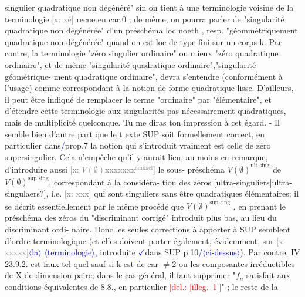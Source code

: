 \documentclass[11pt]{article}
\newcommand{\scanpage}[1]{\par\bigskip\noindent{\small\sffamily[scan #1]}\par}
\newcommand{\mspage}[1]{{\small\sffamily[p.\,#1]}}
\newcommand{\hand}[1]{\textcolor{blue}{#1}}
\newcommand{\inserted}[2][]{\textcolor{blue}{$\langle$#2$\rangle$}}
\newcommand{\deleted}[1]{\textcolor{red}{[\textsf{del.:} #1]}}
\newcommand{\xout}[1]{\textcolor{gray}{[\textsf{x:} #1]}}
\newcommand{\uline}[1]{\underline{#1}}
\newcommand{\unsure}[1]{[#1?]}
\newcommand{\illegible}[1]{[\textsf{illeg.\ #1}]}
\begin{document}
singulier quadratique  non dégénéré" sin on tient à une terminologie
voisine de la terminologie \xout{xé} recue en car.0 ; de même, on pourra
parler de "singularité quadratique non dégénérée" d'un préschéma loc
noeth , resp. "géommétriquement  quadratique non dégénérée" quand on est
loc de type fini sur un corps k.  Par contre, la terminologie
"zéro singulier ordinaire" ou mieux "zéro quadratique ordinaire",
et de même "singularité quadratique ordinaire","singularité géométrique-%
ment quadratique ordinaire",  devra s'entendre (conformément à l'usage)
comme correspondant à la notion de forme quadratique lisse. D'ailleurs,
il peut être indiqué de remplacer le terme "ordinaire" par "élémentaire",
et d'étendre cette terminologie aux singularités pas nécessairement
quadratiques, mais de multiplicité quelconque. Tu me diras ton impression
à cet égard.   -    Il semble bien d'autre part que le t exte SUP soit
formellement correct, en particulier dans\hand{/}prop.7  la notion qui s'introduit
vraiment est celle de zéro supersingulier.  Cela n'empêche qu'il y aurait
lieu, au moins en remarque, d'introduire aussi \xout{$V(\emptyset)$xxxxxxx$^{\text{sinxxél}}$} le sous-%
préschéma  $V(\emptyset)^{\text{ult sing}}$  de $V(\emptyset)^{\text{sup sing}}$, correspondant à la considéra-%
tion des zéros \unsure{ultra-singuliers|ultra-singulaers}, i.e. \xout{xxx} qui sont singuliers sans être
quadratiques élémentaires; il se décrit essentiellement par le même
procédé que $V(\emptyset)^{\text{sup sing}}$  , en prenant le préschéma des zéros du
"discriminant corrigé"  introduit plus bas, au lieu du discriminant ordi-%
naire.  Donc les seules corrections à apporter à SUP semblent d'ordre
terminologique (et elles doivent porter également, évidemment, sur \xout{xxxxx}\inserted[typed]{la}
\inserted[typed]{terminologie}\hand{,}
introduite \hand{$\checkmark$}dans SUP p.10\hand{/}\inserted{ci-dessus}).  Par contre,  IV 23.9.2. est faux tel quel
sauf si k est de car $\neq 2$ \uline{ou} les composantes irréductibles de X  de
dimension paire; dans le cas général, il faut supprimer "$f_n$ satisfait
aux conditions équivalentes de 8.8., en particulier \deleted{\illegible{1}}" ; le reste de la

\mspage{\hand{159}}

\clearpage
\scanpage{25/160}
\mspage{\hand{3}}
\end{document}
